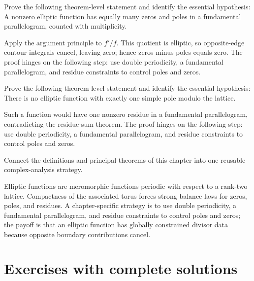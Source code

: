 \begin{problem}\label{prob:iv28-problem-10}
Prove the following theorem-level statement and identify the essential hypothesis: A nonzero elliptic function has equally many zeros and poles in a fundamental parallelogram, counted with multiplicity.
\end{problem}
\begin{solution}
Apply the argument principle to $f'/f$. This quotient is elliptic, so opposite-edge contour integrals cancel, leaving zero; hence zeros minus poles equals zero. The proof hinges on the following step: use double periodicity, a fundamental parallelogram, and residue constraints to control poles and zeros.
\end{solution}

\begin{problem}\label{prob:iv28-problem-11}
Prove the following theorem-level statement and identify the essential hypothesis: There is no elliptic function with exactly one simple pole modulo the lattice.
\end{problem}
\begin{solution}
Such a function would have one nonzero residue in a fundamental parallelogram, contradicting the residue-sum theorem. The proof hinges on the following step: use double periodicity, a fundamental parallelogram, and residue constraints to control poles and zeros.
\end{solution}

\begin{problem}\label{prob:iv28-problem-12}
Connect the definitions and principal theorems of this chapter into one reusable complex-analysis strategy.
\end{problem}
\begin{solution}
Elliptic functions are meromorphic functions periodic with respect to a rank-two lattice. Compactness of the associated torus forces strong balance laws for zeros, poles, and residues. A chapter-specific strategy is to use double periodicity, a fundamental parallelogram, and residue constraints to control poles and zeros; the payoff is that an elliptic function has globally constrained divisor data because opposite boundary contributions cancel.
\end{solution}

\section{Exercises with complete solutions}


